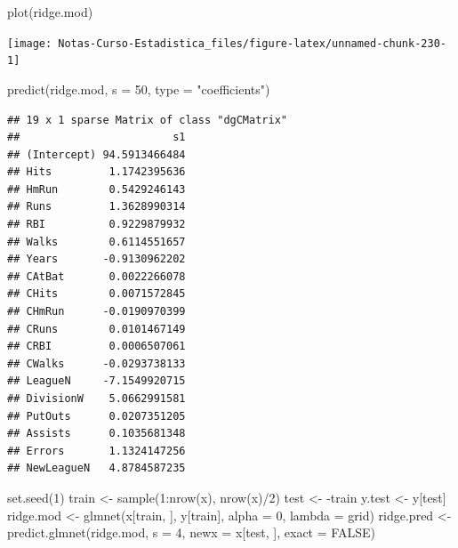 \documentclass[
  12pt,
]{book}
\newenvironment{Shaded}{\begin{snugshade}}{\end{snugshade}}
\newcommand{\AttributeTok}[1]{\textcolor[rgb]{0.77,0.63,0.00}{#1}}
\newcommand{\ConstantTok}[1]{\textcolor[rgb]{0.00,0.00,0.00}{#1}}
\newcommand{\DecValTok}[1]{\textcolor[rgb]{0.00,0.00,0.81}{#1}}
\newcommand{\FunctionTok}[1]{\textcolor[rgb]{0.00,0.00,0.00}{#1}}
\newcommand{\NormalTok}[1]{#1}
\newcommand{\OtherTok}[1]{\textcolor[rgb]{0.56,0.35,0.01}{#1}}
\newcommand{\SpecialCharTok}[1]{\textcolor[rgb]{0.00,0.00,0.00}{#1}}
\newcommand{\StringTok}[1]{\textcolor[rgb]{0.31,0.60,0.02}{#1}}
\begin{document}
\begin{Shaded}
\begin{Highlighting}[]
\FunctionTok{plot}\NormalTok{(ridge.mod)}
\end{Highlighting}
\end{Shaded}

\begin{center}\texttt{[image: Notas-Curso-Estadistica\_files/figure-latex/unnamed-chunk-230-1]} \end{center}

\begin{Shaded}
\begin{Highlighting}[]
\FunctionTok{predict}\NormalTok{(ridge.mod, }\AttributeTok{s =} \DecValTok{50}\NormalTok{, }\AttributeTok{type =} \StringTok{"coefficients"}\NormalTok{)}
\end{Highlighting}
\end{Shaded}

\begin{verbatim}
## 19 x 1 sparse Matrix of class "dgCMatrix"
##                        s1
## (Intercept) 94.5913466484
## Hits         1.1742395636
## HmRun        0.5429246143
## Runs         1.3628990314
## RBI          0.9229879932
## Walks        0.6114551657
## Years       -0.9130962202
## CAtBat       0.0022266078
## CHits        0.0071572845
## CHmRun      -0.0190970399
## CRuns        0.0101467149
## CRBI         0.0006507061
## CWalks      -0.0293738133
## LeagueN     -7.1549920715
## DivisionW    5.0662991581
## PutOuts      0.0207351205
## Assists      0.1035681348
## Errors       1.1324147256
## NewLeagueN   4.8784587235
\end{verbatim}

\begin{Shaded}
\begin{Highlighting}[]
\FunctionTok{set.seed}\NormalTok{(}\DecValTok{1}\NormalTok{)}
\NormalTok{train }\OtherTok{\textless{}{-}} \FunctionTok{sample}\NormalTok{(}\DecValTok{1}\SpecialCharTok{:}\FunctionTok{nrow}\NormalTok{(x), }\FunctionTok{nrow}\NormalTok{(x)}\SpecialCharTok{/}\DecValTok{2}\NormalTok{)}
\NormalTok{test }\OtherTok{\textless{}{-}} \SpecialCharTok{{-}}\NormalTok{train}
\NormalTok{y.test }\OtherTok{\textless{}{-}}\NormalTok{ y[test]}
\NormalTok{ridge.mod }\OtherTok{\textless{}{-}} \FunctionTok{glmnet}\NormalTok{(x[train, ], y[train], }\AttributeTok{alpha =} \DecValTok{0}\NormalTok{,}
    \AttributeTok{lambda =}\NormalTok{ grid)}
\NormalTok{ridge.pred }\OtherTok{\textless{}{-}} \FunctionTok{predict.glmnet}\NormalTok{(ridge.mod, }\AttributeTok{s =} \DecValTok{4}\NormalTok{, }\AttributeTok{newx =}\NormalTok{ x[test,}
\NormalTok{    ], }\AttributeTok{exact =} \ConstantTok{FALSE}\NormalTok{)}
\end{Highlighting}
\end{Shaded}
\end{document}
